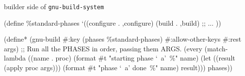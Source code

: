 \documentclass{beamer}
\begin{document}
\begin{frame}[fragile]{builder side of \texttt{gnu-build-system}}
  \vspace{-0.4cm}
  \begin{semiverbatim}
(\alert{define} \%standard-phases
  `((configure . ,configure)
    (build . ,build)
    ;; \textrm{...}
    ))

(\alert{define*} (gnu-build #:key (phases \%standard-phases)
                    #:allow-other-keys
                    #:rest args)
  ;; Run all the PHASES in order, passing them ARGS.
  (every (match-lambda
          ((name . proc)
           (format #t "starting phase `~a'~\%" name)
           (let ((result (apply proc args)))
             (format #t "phase `~a' done~\%" name)
             result)))
         phases))
  \end{semiverbatim}
\end{frame}




\end{document}
